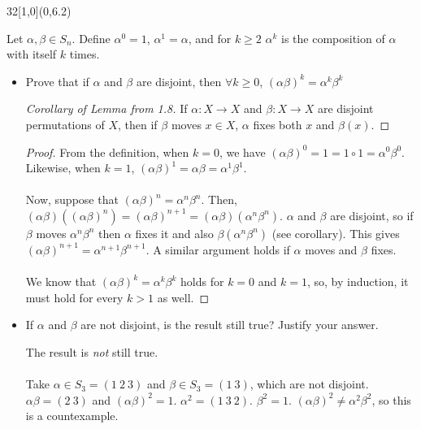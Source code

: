 \documentclass[12pt]{article}
\newenvironment{exercise}[2]{\begin{textblock}{32}[1,0](0,#2)\noindent#1\end{textblock}}{\vspace{1in}}
\begin{document}
\begin{exercise}{1.10}{6.2}
  {\noindent}Let $\alpha, \beta\in S_n$. Define $\alpha^0=1$, $\alpha^1=\alpha$, and for $k\ge 2$ $\alpha^k$ is the composition of $\alpha$ with itself $k$ times.
  \begin{itemize}
    \item Prove that if $\alpha$ and $\beta$ are disjoint, then $\forall k\ge0$, $(\alpha\beta)^k=\alpha^k\beta^k$
    \bigskip

		\begin{proof}[Corollary of Lemma from 1.8]
			If $\alpha:X\to X$ and $\beta:X\to X$ are disjoint permutations of $X$, then if $\beta$ moves $x\in X$, $\alpha$ fixes both $x$ and $\beta(x)$.
		\end{proof}
		\bigskip

  	\begin{proof}
			From the definition, when $k=0$, we have $(\alpha\beta)^0 = 1 = 1\circ 1 = \alpha^0\beta^0$. Likewise, when $k=1$, $(\alpha\beta)^1 = \alpha\beta = \alpha^1\beta^1$.\\
			\\
			Now, suppose that $(\alpha\beta)^n = \alpha^n\beta^n$. Then, $(\alpha\beta)((\alpha\beta)^n) = (\alpha\beta)^{n+1} = (\alpha\beta)(\alpha^n\beta^n)$.
			$\alpha$ and $\beta$ are disjoint, so if $\beta$ moves $\alpha^n\beta^n$ then $\alpha$ fixes it and also $\beta(\alpha^n\beta^n)$ (see corollary).
			This gives $(\alpha\beta)^{n+1} = \alpha^{n+1}\beta^{n+1}$. A similar argument holds if $\alpha$ moves and $\beta$ fixes.\\
			\\
			We know that $(\alpha\beta)^k=\alpha^k\beta^k$ holds for $k=0$ and $k=1$, so, by induction, it must hold for every $k>1$ as well.
  	\end{proof}
  	\vspace{1in}

    \item If $\alpha$ and $\beta$ are not disjoint, is the result still true? Justify your answer.
	  \bigskip

		The result is \textit{not} still true.\\
		\\
		Take $\alpha\in S_3 = (1\ 2\ 3)$ and $\beta\in S_3 = (1\ 3)$, which are not disjoint. $\alpha\beta = (2\ 3)$ and $(\alpha\beta)^2 = 1$. $\alpha^2 = (1\ 3\ 2)$. $\beta^2 = 1$.
		$(\alpha\beta)^2 \neq \alpha^2\beta^2$, so this is a countexample.
  \end{itemize}
\end{exercise}
\end{document}
